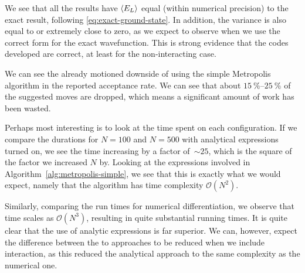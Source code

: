 \documentclass[twocolumn]{article}
\begin{document}
We see that all the results have $\expval{E_L}$
equal (within numerical precision) to the exact result, following
\eqref{eq:exact-ground-state}. In addition, the variance is also equal to
or extremely close to zero, as we expect to observe when we use the correct form
for the exact wavefunction. This is strong evidence that the codes developed are
correct, at least for the non-interacting case.

We can see the already motioned downside of using the simple Metropolis
algorithm in the reported acceptance rate. We can see that about
$\SIrange{15}{25}{\percent}$ of the suggested moves are dropped, which means a
significant amount of work has been wasted.

Perhaps most interesting is to look at the time spent on each configuration. If
we compare the durations for $N=100$ and $N=500$ with analytical expressions
turned on, we see the time increasing by a factor of~$\sim 25$, which is the
square of the factor we increased $N$ by. Looking at the expressions involved in
Algorithm~\ref{alg:metropolis-simple}, we see that this is exactly what we would
expect, namely that the algorithm has time complexity $\mathcal{O}(N^2)$.

Similarly, comparing the run times for numerical differentiation, we observe
that time scales as $\mathcal{O}(N^3)$, resulting in quite substantial running
times. It is quite clear that the use of analytic expressions is far superior.
We can, however, expect the difference between the to approaches to be reduced when we include
interaction, as this reduced the analytical approach to the same complexity as
the numerical one.

\newpage
\end{document}
